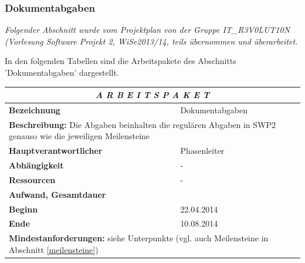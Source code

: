 \documentclass[fontsize=12pt,paper=a4,twoside]{scrartcl}
\begin{document}
\subsubsection{Dokumentabgaben}\label{aps}

\textit{Folgender Abschnitt wurde vom Projektplan von der Gruppe IT\_R3V0LUT10N (Vorlesung Software Projekt 2, WiSe2013/14, teils übernommen und überarbeitet.}

In den folgenden Tabellen sind die Arbeitspakete des Abschnitts 'Dokumentabgaben' dargestellt. 

\begin{tabular}{p{7.5cm}|p{7.5cm}}\toprule
\multicolumn{2}{c}{\textbf{\textit{A R B E I T S P A K E T \quad 5}}} \\ \toprule \hline
\textbf{Bezeichnung} & Dokumentabgaben\\\hline
\multicolumn{2}{p{15cm}}{\textbf{Beschreibung:} \newline 
Die Abgaben beinhalten die regulären Abgaben in SWP2 genauso wie die jeweiligen Meilensteine}  \\\hline
\textbf{Hauptverantwortlicher} & Phasenleiter \\\hline
\textbf{Abhängigkeit} & -\\\hline
\textbf{Ressourcen} & -\\\hline
\textbf{Aufwand, Gesamtdauer} & \\\hline
\textbf{Beginn} & 22.04.2014 \\\hline
\textbf{Ende} & 10.08.2014\\\hline
\multicolumn{2}{p{15cm}}{\textbf{Mindestanforderungen: } \newline
siehe Unterpunkte (vgl. auch Meilensteine in Abschnitt \ref{meilensteine})}  \\ \toprule
\end{tabular} \\\\
\end{document}
